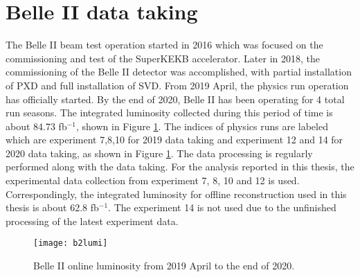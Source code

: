 \section{Belle II data taking}
The Belle II beam test operation started in 2016 which was focused on the commissioning and test of the SuperKEKB accelerator. Later in 2018, the commissioning of the Belle II detector was accomplished, with partial installation of PXD and full installation of SVD. From 2019 April, the physics run operation has officially started. By the end of 2020, Belle II has been operating for 4 total run seasons. The integrated luminosity collected during this period of time is about 84.73 fb$^{-1}$, shown in Figure \ref{fig:b2lumi}. The indices of physics runs are labeled which are experiment 7,8,10 for 2019 data taking and experiment 12 and 14 for 2020 data taking, as shown in Figure \ref{fig:b2lumi}. The data processing is regularly performed along with the data taking. For the analysis reported in this thesis, the experimental data collection from experiment 7, 8, 10 and 12 is used. Correspondingly, the integrated luminosity for offline reconstruction used in this thesis is about 62.8 fb$^{-1}$\cite{b2onlinelumi}. The experiment 14 is not used due to the unfinished processing of the latest experiment data. 

\begin{figure}
	\centering
	\texttt{[image: b2lumi]}
	\caption{Belle II online luminosity from 2019 April to the end of 2020.}
	\label{fig:b2lumi} 
\end{figure}
